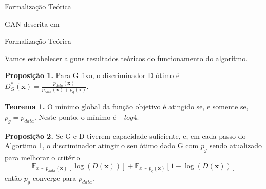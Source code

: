 \documentclass[10pt]{beamer}
\begin{document}
\begin{frame}[fragile]{Formalização Teórica}

  \footnotesize
  \begin{algorithm}[H]
  \SetAlgoLined
   \caption{GAN descrita em \citet{goodfellow2014}}
  \end{algorithm}

\end{frame}

\begin{frame}[fragile]{Formalização Teórica}

	Vamos estabelecer alguns resultados teóricos do funcionamento
	do algoritmo.

	\small
	\textbf{Proposição 1.} Para G fixo, o discriminador D ótimo é
	$
	D^*_G(\bm x) = \frac{p_{data}(\bm x)}
	{p_{data}(\bm x) + p_g(\bm x)}
	$.

	\hfill
	\break
	\textbf{Teorema 1.} O mínimo global da função objetivo
	é atingido se, e somente se, $p_g = p_{data}$. Neste ponto,
	o mínimo é $-log 4$.

	\hfill
	\break
	\textbf{Proposição 2.} Se G e D tiverem capacidade suficiente,
	e, em cada passo do Algortimo 1, o discriminador atingir o seu
	ótimo dado G com $p_g$ sendo atualizado para melhorar o critério
    $$
    \mathbb{E}_{x\sim p_{data}(\bm x)}\left[\log{(D(\bm x))}\right]+
    \mathbb{E}_{x\sim p_g(\bm x)}\left[1-\log{(D(\bm x))}\right]
    $$
    então $p_g$ converge para $p_{data}$.

\end{frame}
\end{document}
